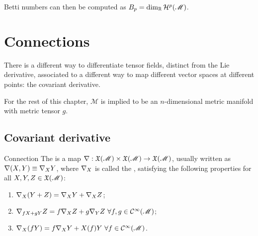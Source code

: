 Betti numbers can then be computed as $ B_p = \dim_{\mathbb{R}} \mathcal{H}^{p}(\mathscr{M}) $.

\newpage
\section{Connections}

There is a different way to differentiate tensor fields, distinct from the Lie derivative, associated to a different way to map different vector spaces at different points: the covariant derivative.

For the rest of this chapter, $ \mathcal{M} $ is implied to be an $ n $-dimensional metric manifold with metric tensor $ g $.

\subsection{Covariant derivative}

\begin{definition}{Connection}{}
  The  is a map $ \nabla : \mathfrak{X}(\mathscr{M}) \times \mathfrak{X}(\mathscr{M}) \rightarrow \mathfrak{X}(\mathscr{M}) $, usually written as $ \nabla(X,Y) \equiv \nabla_X Y $, where $ \nabla_X $ is called the , satisfying the following properties for all $ X,Y,Z \in \mathfrak{X}(\mathscr{M}) $:
  \begin{enumerate}
    \item $ \nabla_X (Y + Z) = \nabla_X Y + \nabla_X Z $;
    \item $ \nabla_{fX + gY} Z = f \nabla_X Z + g \nabla_Y Z \,\,\forall f,g \in \mathcal{C}^{\infty}(\mathscr{M}) $;
    \item $ \nabla_X (fY) = f \nabla_X Y + X(f) Y \,\,\forall f \in \mathcal{C}^{\infty}(\mathscr{M}) $.
  \end{enumerate}
\end{definition}

